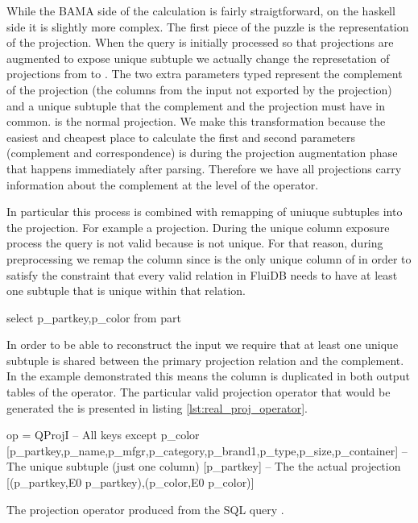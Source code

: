 While the BAMA side of the calculation is fairly straigtforward, on
the haskell side it is slightly more complex. The first piece of the
puzzle is the representation of the projection. When the query is
initially processed so that projections are augmented to expose unique
subtuple we actually change the represetation of projections from
 to . The
two extra parameters typed \hask{[e]} represent the complement of the
projection (the columns from the input not exported by the projection)
and a unique subtuple that the complement and the projection must have
in common. \hask{[(e,Expr e)]} is the normal projection. We make this
transformation because the easiest and cheapest place to calculate the
first and second parameters (complement and correspondence) is during
the projection augmentation phase that happens immediately after
parsing. Therefore we have all projections carry information about the
complement at the level of the operator.

In particular this process is combined with remapping of uniuque
subtuples into the projection. For example a projection. During the
unique column exposure process the query  is not valid because  is not unique. For that
reason, during preprocessing we remap the  column
since  is the only unique column of 
in order to satisfy the constraint that every valid relation in FluiDB
needs to have at least one subtuple that is unique within that
relation.

\begin{sqlcode}
select p_partkey,p_color from part
\end{sqlcode}

In order to be able to reconstruct the input we require that at least
one unique subtuple is shared between the primary projection relation
and the complement. In the example demonstrated this means the
 column is duplicated in both output tables of the
operator. The particular valid projection operator that would be
generated the  is presented in listing
\ref{lst:real_proj_operator}.

\begin{code}
\begin{haskellcode}
op =
  QProjI
    -- All keys except p_color
    [p_partkey,p_name,p_mfgr,p_category,p_brand1,p_type,p_size,p_container]
    -- The unique subtuple (just one column)
    [p_partkey]
    -- The the actual projection
    [(p_partkey,E0 p_partkey),(p_color,E0 p_color)]
\end{haskellcode}
  \caption{\label{lst:real_proj_operator}The projection operator
    produced from the SQL query .}
\end{code}

